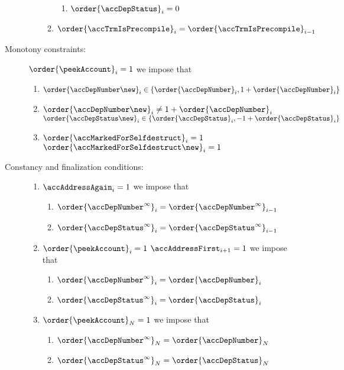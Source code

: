 \begin{description}
\begin{enumerate}
\begin{enumerate}
\begin{enumerate}
							\item $\order{\accDepStatus  }_{i} = 0$
						\end{enumerate}
					\item $\order{\accTrmIsPrecompile}_{i} = \order{\accTrmIsPrecompile}_{i - 1}$
				\end{enumerate}
		\end{enumerate}
	\item[Monotony constraints:]
		\If $\order{\peekAccount}_{i} = 1$ \Then
		we impose that
		\begin{enumerate}
			\item $ \order{\accDepNumber \new }_{i} \in \{ \order{\accDepNumber  }_{i}, 1 + \order{\accDepNumber  }_{i} \} $
			\item \If $ \order{\accDepNumber \new }_{i} \neq 1 + \order{\accDepNumber  }_{i} $ \\
				{} \qquad\qquad \Then $\order{\accDepStatus \new }_{i} \in \{ \order{\accDepStatus  }_{i}, - 1 + \order{\accDepStatus  }_{i} \} $
			\item \If $ \order{\accMarkedForSelfdestruct}_{i} = 1$ \\
				\Then $\order{\accMarkedForSelfdestruct\new}_{i} = 1 $
		\end{enumerate}
	\item[Constancy and finalization conditions:]
		\begin{enumerate}
			\item \If $\accAddressAgain _{i} = 1$ \Then
				we impose that
				\begin{enumerate}
					\item $\order{\accDepNumber^\infty}_{i} = \order{\accDepNumber^\infty}_{i - 1}$ 
					\item $\order{\accDepStatus^\infty}_{i} = \order{\accDepStatus^\infty}_{i - 1}$ 
				\end{enumerate}
			\item \If $\order{\peekAccount}_{i} = 1$ \et $\accAddressFirst _{i + 1} = 1$ \Then
				we impose that
				\begin{enumerate}
					\item $\order{\accDepNumber^\infty}_{i} = \order{\accDepNumber}_{i}$ 
					\item $\order{\accDepStatus^\infty}_{i} = \order{\accDepStatus}_{i}$ 
				\end{enumerate}
			\item \If $\order{\peekAccount}_{N} = 1$ \Then
				we impose that
				\begin{enumerate}
					\item $\order{\accDepNumber^\infty}_{N} = \order{\accDepNumber}_{N}$ 
					\item $\order{\accDepStatus^\infty}_{N} = \order{\accDepStatus}_{N}$ 
				\end{enumerate}
		\end{enumerate}
\end{description}
